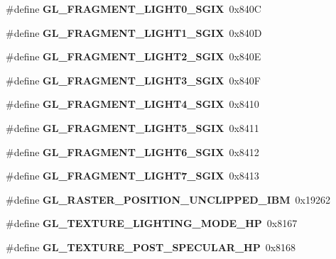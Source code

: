 \begin{DoxyCompactItemize}
\item 
\#define {\bfseries G\+L\+\_\+\+F\+R\+A\+G\+M\+E\+N\+T\+\_\+\+L\+I\+G\+H\+T0\+\_\+\+S\+G\+I\+X}~0x840\+C\label{_s_d_l__opengl_8h_a72fba9bfca2086f02c1ba0fe31e66412}

\item 
\#define {\bfseries G\+L\+\_\+\+F\+R\+A\+G\+M\+E\+N\+T\+\_\+\+L\+I\+G\+H\+T1\+\_\+\+S\+G\+I\+X}~0x840\+D\label{_s_d_l__opengl_8h_a96839cc51c795f082f7c3cce831d04e0}

\item 
\#define {\bfseries G\+L\+\_\+\+F\+R\+A\+G\+M\+E\+N\+T\+\_\+\+L\+I\+G\+H\+T2\+\_\+\+S\+G\+I\+X}~0x840\+E\label{_s_d_l__opengl_8h_ac9c02b3aae25475714bdeada08940f01}

\item 
\#define {\bfseries G\+L\+\_\+\+F\+R\+A\+G\+M\+E\+N\+T\+\_\+\+L\+I\+G\+H\+T3\+\_\+\+S\+G\+I\+X}~0x840\+F\label{_s_d_l__opengl_8h_a044441810db876e0b75fa0135a05524a}

\item 
\#define {\bfseries G\+L\+\_\+\+F\+R\+A\+G\+M\+E\+N\+T\+\_\+\+L\+I\+G\+H\+T4\+\_\+\+S\+G\+I\+X}~0x8410\label{_s_d_l__opengl_8h_a14f57d914d74f0a2d79f7d463b089a73}

\item 
\#define {\bfseries G\+L\+\_\+\+F\+R\+A\+G\+M\+E\+N\+T\+\_\+\+L\+I\+G\+H\+T5\+\_\+\+S\+G\+I\+X}~0x8411\label{_s_d_l__opengl_8h_a873fb45cc7183265277a72c0e61c1c64}

\item 
\#define {\bfseries G\+L\+\_\+\+F\+R\+A\+G\+M\+E\+N\+T\+\_\+\+L\+I\+G\+H\+T6\+\_\+\+S\+G\+I\+X}~0x8412\label{_s_d_l__opengl_8h_a06ff5e173bdd0391698a0cc90226e320}

\item 
\#define {\bfseries G\+L\+\_\+\+F\+R\+A\+G\+M\+E\+N\+T\+\_\+\+L\+I\+G\+H\+T7\+\_\+\+S\+G\+I\+X}~0x8413\label{_s_d_l__opengl_8h_aebb021d844fa62aceaba74736f9c09de}

\item 
\#define {\bfseries G\+L\+\_\+\+R\+A\+S\+T\+E\+R\+\_\+\+P\+O\+S\+I\+T\+I\+O\+N\+\_\+\+U\+N\+C\+L\+I\+P\+P\+E\+D\+\_\+\+I\+B\+M}~0x19262\label{_s_d_l__opengl_8h_adc57bf3d52b6aa51c993dd434b5cd0ef}

\item 
\#define {\bfseries G\+L\+\_\+\+T\+E\+X\+T\+U\+R\+E\+\_\+\+L\+I\+G\+H\+T\+I\+N\+G\+\_\+\+M\+O\+D\+E\+\_\+\+H\+P}~0x8167\label{_s_d_l__opengl_8h_a4fcae5d12b587867b0aed9a5262b0ea4}

\item 
\#define {\bfseries G\+L\+\_\+\+T\+E\+X\+T\+U\+R\+E\+\_\+\+P\+O\+S\+T\+\_\+\+S\+P\+E\+C\+U\+L\+A\+R\+\_\+\+H\+P}~0x8168\label{_s_d_l__opengl_8h_a1721d1a906e60610b1fe070881bf8858}


\end{DoxyCompactItemize}
